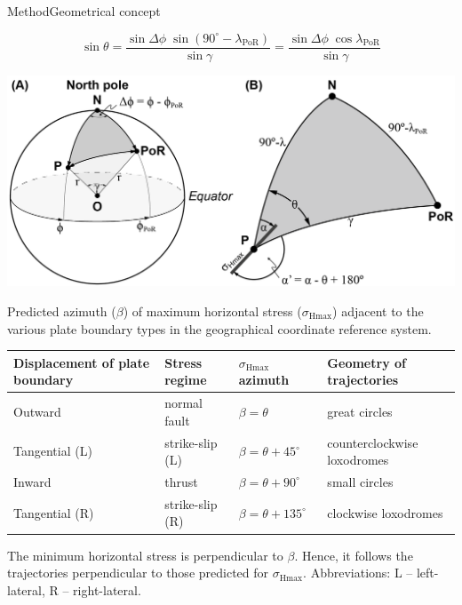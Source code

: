 \documentclass[10pt,xcolor=dvipsnames, aspectratio=169]{beamer}
\newcommand{\shmax}{$\sigma_\text{Hmax}$}
\begin{document}
 \begin{frame}{Method}{Geometrical concept}
 \begin{minipage}{.54\linewidth}
   \[
    \sin\theta = \frac{\sin{\Delta\phi} \; \sin{(90^\circ - \lambda_\text{PoR})}}{\sin{\gamma}} =
     \frac{\sin{\Delta\phi} \; \cos{\lambda_\text{PoR}}}{\sin{\gamma}}
 \]
 \end{minipage}
 \hfill
 \begin{minipage}{.44\linewidth}
   \includegraphics[width=\linewidth]{Figure_06_spherical_triangle}
 \end{minipage}  
 
  \vfill
 
 \scriptsize
 Predicted azimuth ($\beta$) of maximum horizontal stress (\shmax{}) adjacent to the various plate boundary types in the geographical coordinate reference system.
  \begin{tabular}{llll}
    \toprule
    Displacement of plate boundary & Stress regime & \shmax{} azimuth & Geometry of trajectories \\
    \midrule
    Outward & normal fault & $\beta = \theta$ & great circles \\
    Tangential (L) & strike-slip (L) & $\beta = \theta + 45^{\circ}$ & counterclockwise loxodromes\\
    Inward & thrust & $\beta = \theta + 90^{\circ}$  & small circles\\
    Tangential (R) & strike-slip (R) & $\beta = \theta + 135^{\circ}$ & clockwise loxodromes\\
    \bottomrule
    \end{tabular}
    
   
    \tiny The minimum horizontal stress is perpendicular to $\beta$. Hence, it follows the trajectories perpendicular to those predicted for \shmax{}. \newline
    Abbreviations: L -- left-lateral, R -- right-lateral.
  
 
 \end{frame}
\end{document}
